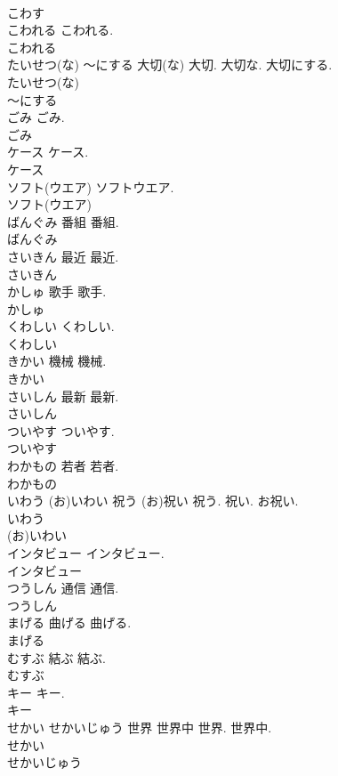 \documentclass[8pt]{extreport}
\begin{document}
\begin{CJK}{UTF8}{min}
\\	こわす
\\	こわれる		こわれる.	
\\	こわれる
\\	たいせつ(な) ～にする	大切(な)	大切. 大切な. 大切にする.	
\\	たいせつ(な)
\\	～にする
\\	ごみ		ごみ.	
\\	ごみ
\\	ケース		ケース.	
\\	ケース
\\	ソフト(ウエア)		ソフトウエア.	
\\	ソフト(ウエア)
\\	ばんぐみ	番組	番組.	
\\	ばんぐみ
\\	さいきん	最近	最近.	
\\	さいきん
\\	かしゅ	歌手	歌手.	
\\	かしゅ
\\	くわしい		くわしい.	
\\	くわしい
\\	きかい	機械	機械.	
\\	きかい
\\	さいしん	最新	最新.	
\\	さいしん
\\	ついやす		ついやす.	
\\	ついやす
\\	わかもの	若者	若者.	
\\	わかもの
\\	いわう (お)いわい	祝う (お)祝い	祝う. 祝い. お祝い.	
\\	いわう
\\	(お)いわい
\\	インタビュー		インタビュー.	
\\	インタビュー
\\	つうしん	通信	通信.	
\\	つうしん
\\	まげる	曲げる	曲げる.	
\\	まげる
\\	むすぶ	結ぶ	結ぶ.	
\\	むすぶ
\\	キー		キー.	
\\	キー
\\	せかい せかいじゅう	世界 世界中	世界. 世界中.	
\\	せかい
\\	せかいじゅう

\end{CJK}
\end{document}
